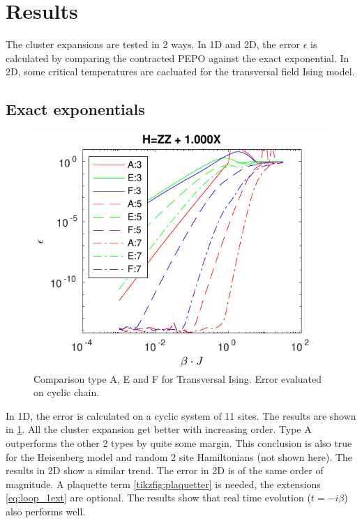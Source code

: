 \documentclass[twocolumn]{article}
\newcounter{a}
\newcounter{b}
\begin{document}

\section{Results}
The cluster expansions are tested in 2 ways. In 1D and 2D, the error $\epsilon$ is calculated by comparing the contracted PEPO against the exact exponential. In 2D, some critical temperatures are cacluated for the transversal field Ising model.

\subsection{Exact exponentials}\label{subsec:exexp}
\begin{figure}[h!]
    \center
    \includegraphics[width=\linewidth]{../Figuren/benchmarking/t_ising_small.pdf}
    \caption{Comparison type A, E and F for Transversal Ising. Error evaluated on cyclic chain. }
    \label{fig:benchmark:tising}
\end{figure}

In 1D, the error is calculated on a cyclic system of 11 sites. The results are shown in \cref{fig:benchmark:tising}. All the cluster expansion get better with increasing order. Type A outperforms the other 2 types by quite some margin. This conclusion is also true for the Heisenberg model and random 2 site Hamiltonians (not shown here). The results in 2D show a similar trend. The error in 2D is of the same order of magnitude. A plaquette term \cref{tikzfig:plaquetter} is needed, the extensions \cref{eq:loop_1ext}  are optional. The results show that real time evolution ($t = - i \beta$) also performs well.
\end{document}
